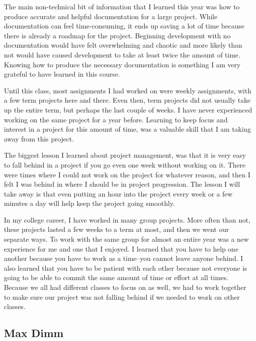 \documentclass[letterpaper,10pt,draftclsnofoot,onecolumn,titlepage]{IEEEtran}
\begin{document}
		The main non-technical bit of information that I learned this year was how to produce accurate and helpful documentation for a large project.
		While documentation can feel time-consuming, it ends up saving a lot of time because there is already a roadmap for the project.
		Beginning development with no documentation would have felt overwhelming and chaotic and more likely than not would have caused development to take at least twice the amount of time.
		Knowing how to produce the necessary documentation is something I am very grateful to have learned in this course.

		Until this class, most assignments I had worked on were weekly assignments, with a few term projects here and there.
		Even then, term projects did not usually take up the entire term, but perhaps the last couple of weeks.
		I have never experienced working on the same project for a year before.
		Learning to keep focus and interest in a project for this amount of time, was a valuable skill that I am taking away from this project.


		The biggest lesson I learned about project management, was that it is very easy to fall behind in a project if you go even one week without working on it.
		There were times where I could not work on the project for whatever reason, and then I felt I was behind in where I should be in project progression.
		The lesson I will take away is that even putting an hour into the project every week or a few minutes a day will help keep the project going smoothly.

		In my college career, I have worked in many group projects.
		More often than not, these projects lasted a few weeks to a term at most, and then we went our separate ways.
		To work with the same group for almost an entire year was a new experience for me and one that I enjoyed.
		I learned that you have to help one another because you have to work as a time--you cannot leave anyone behind.
		I also learned that you have to be patient with each other because not everyone is going to be able to commit the same amount of time or effort at all times.
		Because we all had different classes to focus on as well, we had to work together to make sure our project was not falling behind if we needed to work on other classes.


	\subsection{Max Dimm}
\end{document}
